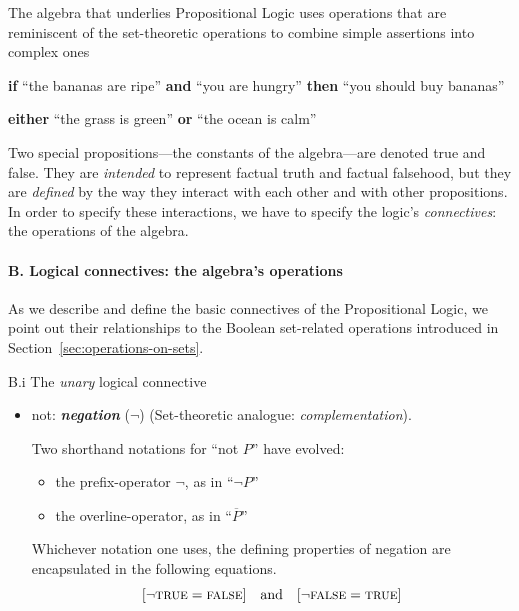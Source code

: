 \bigskip

The algebra that underlies Propositional Logic uses operations that are reminiscent of the set-theoretic operations to combine simple assertions into complex ones

\smallskip

{\bf if} ``the bananas are ripe'' {\bf and} ``you are hungry'' {\bf then} ``you should buy bananas''

\smallskip

{\bf either} ``the grass is green'' {\bf or} ``the ocean is calm''

\smallskip

\noindent
Two special propositions---the constants of the algebra---are denoted {\sc true} and {\sc false}.  They are {\em intended} to represent factual truth and factual falsehood, but they are {\em defined} by the way they interact with each other and with other propositions.  In order
to specify these interactions, we have to specify the logic's {\it connectives}: the operations of the algebra.


\paragraph{B. Logical connectives: the algebra's operations}

\noindent
As we describe and define the basic connectives of the Propositional Logic, we point out their relationships to the Boolean set-related operations introduced in Section~\ref{sec:operations-on-sets}.

\medskip

\noindent B.i {\small\sf The {\em unary} logical connective}
\begin{itemize}
\item
{\sc not}: {\bf\em negation} ($\neg$)
\hspace*{.1in}
{\small\sf (Set-theoretic analogue: {\em complementation})}.

\smallskip

Two shorthand notations for ``{\sc not} $P$'' have evolved:
  \begin{itemize}
  \item
the prefix-operator $\neg$, as in ``$\neg P$''
  \medskip\item
the overline-operator, as in ``$\overline{P}$''
  \end{itemize}
Whichever notation one uses, the defining properties of negation are encapsulated in the following equations.
\[
[\neg \mbox{\sc true} = \mbox{\sc false}] \ \ \mbox{ and } \ \
 [\neg \mbox{\sc false} = \mbox{\sc true}]
\]
\end{itemize}


